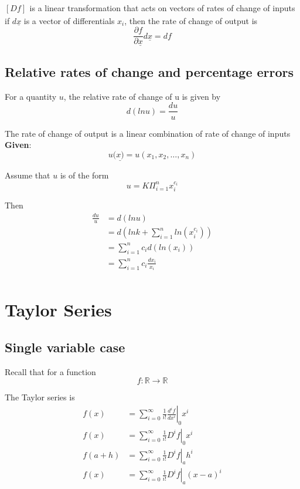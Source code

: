 $ \left[ D f \right]_{} $ is a linear transformation that acts on vectors of rates of change of inputs \\

if $ d \underline{x}$ is a vector of differentials $ x_i$, then the rate of change of output is
\[
   \frac{\partial f}{\partial \underline{x}} d \underline{x} = df
\] 

\subsection{Relative rates of change and percentage errors}

\begin{framed}
   For a quantity $u$, the relative rate of change of u is given by
   \[
     d(ln u) = \frac{du}{u}
   \] 
\end{framed}

The rate of change of output is a linear combination of rate of change of inputs  \\

\textbf{Given}: 
\[
  u( \underline{x)} = u (x_1, x_2, \hdots , x_n)
\] 

Assume that $u$ is of the form
\[
   u = K \Pi_{i=1}^{n} x_i^{c_i}
\] 

Then
\begin{align*}
   \frac{du}{u} &= d (ln u) \\
                &= d(ln k + \sum_{i=1}^{n} ln(x_i^{c_i})) \\
                &= \sum_{i=1}^{n} c_i d(ln(x_i)) \\
                &= \sum_{i=1}^{n} c_i \frac{dx_i}{x_i}\\
\end{align*}

\section{Taylor Series}

\subsection{Single variable case}
\begin{framed}
   Recall that for a function
   \[
     f: \mathbb{R} \rightarrow \mathbb{R}
   \] 

   The Taylor series is
   \begin{align*}
      f(x) &= \sum_{i=0}^{\infty} \frac{1}{i!} \left. \frac{d^i f}{dx^i} \right|_{0} x^i  \\
      f(x) &= \sum_{i=0}^{\infty} \frac{1}{i!} \left. D^i f \right|_{0} x^i  \\
      f(a + h) &= \sum_{i=0}^{\infty} \frac{1}{i!} \left. D^i f \right|_{a} h^i  \\
      f(x) &= \sum_{i=0}^{\infty} \frac{1}{i!} \left. D^i f \right|_{a} (x-a)^i 
   \end{align*}
\end{framed}

